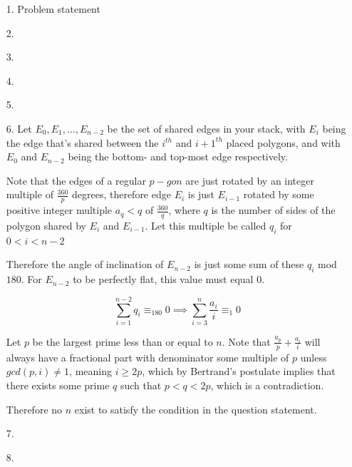 \documentclass{article}
\begin{document}
\begin{enumerate}

\medskip
\item[1.] %
Problem statement


\medskip
\item[2.]


\medskip
\item[3.]


\medskip
\item[4.]


\medskip
\item[5.]


\medskip
\item[6.] %
Let $E_0,E_1,...,E_{n-2}$ be the set of shared edges in your stack, with $E_i$ being the edge that's shared between the $i^{th}$ and $i+1^{th}$ placed polygons, and with $E_0$ and $E_{n-2}$ being the bottom- and top-most edge respectively.

Note that the edges of a regular $p-gon$ are just rotated by an integer multiple of $\frac{360}{p}$ degrees, therefore edge $E_i$ is just $E_{i-1}$ rotated by some positive integer multiple $a_q < q$ of $\frac{360}{q}$, where $q$ is the number of sides of the polygon shared by $E_i$ and $E_{i-1}$.
Let this multiple be called $q_i$ for $0<i<n-2$

Therefore the angle of inclination of $E_{n-2}$ is just some sum of these $q_i$ mod $180$.
For $E_{n-2}$ to be perfectly flat, this value must equal $0$.

\[ \sum_{i=1}^{n-2} q_i \equiv_{180} 0 \implies {\sum_{i=3}^{n} \frac{a_i}{i} \equiv_{1} 0} \]

Let $p$ be the largest prime less than or equal to $n$.
Note that $\frac{a_p}{p} + \frac{a_i}{i}$ will always have a fractional part with denominator some multiple of $p$ unless $gcd(p,i) \neq 1$, meaning $i \geq 2p$, which by Bertrand's postulate implies that there exists some prime $q$ such that $p < q < 2p$, which is a contradiction.

Therefore no $n$ exist to satisfy the condition in the question statement.

\medskip
\item[7.]


\medskip
\item[8.]


\end{enumerate}
\end{document}
